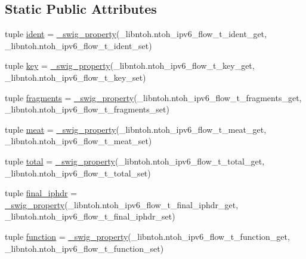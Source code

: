 \subsection*{Static Public Attributes}
\begin{DoxyCompactItemize}
\item 
tuple \hyperlink{classlibntoh_1_1ntoh__ipv6__flow__t_a219b3ba79a48452030ad36cf2519ee85}{ident} = \hyperlink{namespacelibntoh_ae6f5626f776538e0cdb00e75ca1c96c9}{\-\_\-swig\-\_\-property}(\-\_\-libntoh.\-ntoh\-\_\-ipv6\-\_\-flow\-\_\-t\-\_\-ident\-\_\-get, \-\_\-libntoh.\-ntoh\-\_\-ipv6\-\_\-flow\-\_\-t\-\_\-ident\-\_\-set)
\item 
tuple \hyperlink{classlibntoh_1_1ntoh__ipv6__flow__t_a29eb8dd921f77e19e24a20bcd820c2ed}{key} = \hyperlink{namespacelibntoh_ae6f5626f776538e0cdb00e75ca1c96c9}{\-\_\-swig\-\_\-property}(\-\_\-libntoh.\-ntoh\-\_\-ipv6\-\_\-flow\-\_\-t\-\_\-key\-\_\-get, \-\_\-libntoh.\-ntoh\-\_\-ipv6\-\_\-flow\-\_\-t\-\_\-key\-\_\-set)
\item 
tuple \hyperlink{classlibntoh_1_1ntoh__ipv6__flow__t_a61a562f6a662704721df2bd666792d24}{fragments} = \hyperlink{namespacelibntoh_ae6f5626f776538e0cdb00e75ca1c96c9}{\-\_\-swig\-\_\-property}(\-\_\-libntoh.\-ntoh\-\_\-ipv6\-\_\-flow\-\_\-t\-\_\-fragments\-\_\-get, \-\_\-libntoh.\-ntoh\-\_\-ipv6\-\_\-flow\-\_\-t\-\_\-fragments\-\_\-set)
\item 
tuple \hyperlink{classlibntoh_1_1ntoh__ipv6__flow__t_a05f7a909b2438fcd11159037a9b76457}{meat} = \hyperlink{namespacelibntoh_ae6f5626f776538e0cdb00e75ca1c96c9}{\-\_\-swig\-\_\-property}(\-\_\-libntoh.\-ntoh\-\_\-ipv6\-\_\-flow\-\_\-t\-\_\-meat\-\_\-get, \-\_\-libntoh.\-ntoh\-\_\-ipv6\-\_\-flow\-\_\-t\-\_\-meat\-\_\-set)
\item 
tuple \hyperlink{classlibntoh_1_1ntoh__ipv6__flow__t_a707ba789fae19e34fbeeca4da8c30c5f}{total} = \hyperlink{namespacelibntoh_ae6f5626f776538e0cdb00e75ca1c96c9}{\-\_\-swig\-\_\-property}(\-\_\-libntoh.\-ntoh\-\_\-ipv6\-\_\-flow\-\_\-t\-\_\-total\-\_\-get, \-\_\-libntoh.\-ntoh\-\_\-ipv6\-\_\-flow\-\_\-t\-\_\-total\-\_\-set)
\item 
tuple \hyperlink{classlibntoh_1_1ntoh__ipv6__flow__t_aaae262685d5063d60668907a4beaf956}{final\-\_\-iphdr} = \hyperlink{namespacelibntoh_ae6f5626f776538e0cdb00e75ca1c96c9}{\-\_\-swig\-\_\-property}(\-\_\-libntoh.\-ntoh\-\_\-ipv6\-\_\-flow\-\_\-t\-\_\-final\-\_\-iphdr\-\_\-get, \-\_\-libntoh.\-ntoh\-\_\-ipv6\-\_\-flow\-\_\-t\-\_\-final\-\_\-iphdr\-\_\-set)
\item 
tuple \hyperlink{classlibntoh_1_1ntoh__ipv6__flow__t_a543077174a1281b9d00884a11a040629}{function} = \hyperlink{namespacelibntoh_ae6f5626f776538e0cdb00e75ca1c96c9}{\-\_\-swig\-\_\-property}(\-\_\-libntoh.\-ntoh\-\_\-ipv6\-\_\-flow\-\_\-t\-\_\-function\-\_\-get, \-\_\-libntoh.\-ntoh\-\_\-ipv6\-\_\-flow\-\_\-t\-\_\-function\-\_\-set)

\end{DoxyCompactItemize}

